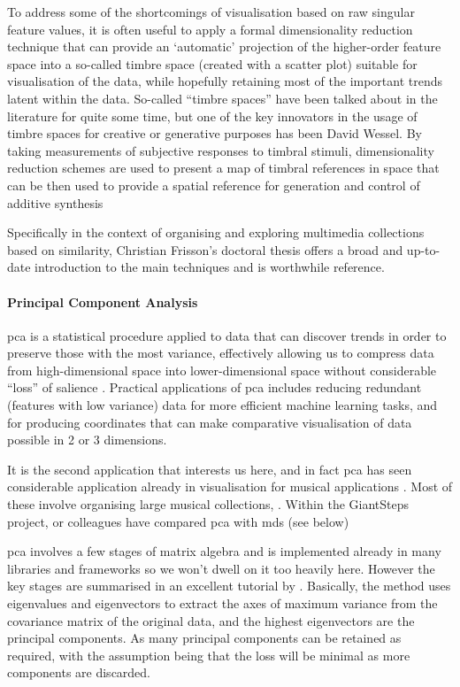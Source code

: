 To address some of the shortcomings of visualisation based on raw singular feature values, it is often useful to apply a formal dimensionality reduction technique that can provide an `automatic' projection of the higher-order feature space into a so-called timbre space (created with a scatter plot) suitable for visualisation of the data, while hopefully retaining most of the important trends latent within the data. So-called ``timbre spaces''  have been talked about in the literature for quite some time, but one of the key innovators in the usage of timbre spaces for creative or generative purposes has been David Wessel. By taking measurements of subjective responses to timbral stimuli, dimensionality reduction schemes are used to present a map of timbral references in space that can be then used to provide a spatial reference for generation and control of additive synthesis \citep{Wessel1979, Wessel1976}

Specifically in the context of organising and exploring multimedia collections based on similarity, Christian Frisson's doctoral thesis \citeyearpar{frisson2015} offers a broad and up-to-date introduction to the main techniques and is worthwhile reference.

\paragraph{Principal Component Analysis}

\acrfull{pca} is a statistical procedure applied to data that can discover trends in order to preserve those with the most variance, effectively allowing us to compress data from high-dimensional space into lower-dimensional space without considerable ``loss'' of salience \cite{Hackeling2014} . Practical applications of \acrshort{pca} includes reducing redundant (features with low variance) data for more efficient machine learning tasks, and for producing coordinates that can make comparative visualisation of data possible in 2 or 3 dimensions.

It is the second application that interests us here, and in fact \acrshort{pca} has seen considerable application already in visualisation for musical applications \citep{Cooper2006}. Most of these involve organising large musical collections, . Within the GiantSteps project, or colleagues have compared  \acrshort{pca} with \acrshort{mds} (see below) 

\acrshort{pca} involves a few stages of matrix algebra and is implemented already in many libraries and frameworks so we won't dwell on it too heavily here. However the key stages are summarised in an excellent tutorial by \citep{Smith2002a}. Basically, the method uses eigenvalues and eigenvectors to extract the axes of maximum variance from the covariance matrix of the original data, and the highest eigenvectors are the principal components. As many principal components can be retained as required, with the assumption being that the loss will be minimal as more components are discarded.

